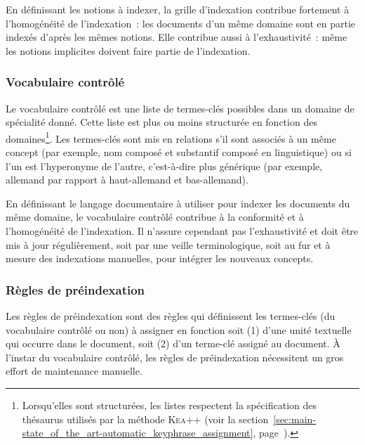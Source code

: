        En définissant les notions à indexer, la grille d'indexation contribue
        fortement à l'homogénéité de l'indexation~: les documents d'un même
        domaine sont en partie indexés d'après les mêmes notions. Elle contribue
        aussi à l'exhaustivité~: même les notions implicites doivent faire
        partie de l'indexation.

      \subsubsection{Vocabulaire contrôlé}
      \label{subsubsec:main-domain_specific_keyphrase_annotation-manual_keyphrase_annotation-resources-controlled_vocabulary}
        Le vocabulaire contrôlé est une liste de termes-clés possibles dans un
        domaine de spécialité donné. Cette liste est plus ou moins structurée en
        fonction des domaines\footnote{Lorsqu'elles sont structurées, les listes
        respectent la spécification des thésaurus utilisés par la méthode
        \textsc{Kea++} (voir la
        section~\ref{sec:main-state_of_the_art-automatic_keyphrase_assignment},
        page~\pageref{sec:main-state_of_the_art-automatic_keyphrase_assignment}).}.
        Les termes-clés sont mis en relations s'il sont associés à un même
        concept (par exemple, \og{}nom composé\fg{} et \og{}substantif
        composé\fg{} en linguistique) ou si l'un est l'hyperonyme de l'autre,
        c'est-à-dire plus  générique (par exemple, \og{}allemand\fg{} par
        rapport à \og{}haut-allemand\fg{} et \og{}bas-allemand\fg{}).
        
        En définissant le langage documentaire à utiliser pour indexer les
        documents du même domaine, le vocabulaire contrôlé contribue à la
        conformité et à l'homogénéité de l'indexation. Il n'assure cependant pas
        l'exhaustivité et doit être mis à jour régulièrement, soit par une
        veille terminologique, soit au fur et à mesure des indexations
        manuelles, pour intégrer les nouveaux concepts.

      \subsubsection{Règles de préindexation}
      \label{subsubsec:main-domain_specific_keyphrase_annotation-manual_keyphrase_annotation-resources-preindexing_rules}
        Les règles de préindexation sont des règles qui définissent les
        termes-clés (du vocabulaire contrôlé ou non) à assigner en fonction soit
        (1) d'une unité textuelle qui occurre dans le document, soit (2) d'un
        terme-clé assigné au document. À l'instar du vocabulaire contrôlé, les
        règles de préindexation nécessitent un gros effort de maintenance manuelle.
        
